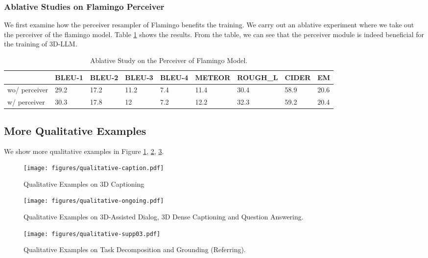 \subsubsection{Ablative Studies on Flamingo Perceiver}
We first examine how the perceiver resampler of Flamingo benefits the training. We carry out an ablative experiment where we take out the perceiver of the flamingo model. Table \ref{tab:perceiver} shows the results. From the table, we can see that the perceiver module is indeed beneficial for the training 
of 3D-LLM.
\begin{table}[!ht]
    \centering
       \small
    \begin{tabular}{l|llllllll}
    \hline
        ~ & BLEU-1 & BLEU-2 & BLEU-3 & BLEU-4 & METEOR & ROUGH\_L & CIDER & EM \\ \hline
        wo/ perceiver & 29.2 & 17.2 & 11.2 & 7.4 & 11.4 & 30.4 & 58.9 & 20.6 \\ \hline
         w/ perceiver & 30.3 & 17.8 & 12 & 7.2 & 12.2 & 32.3 & 59.2 & 20.4 \\ \hline
    \end{tabular}
    \caption{Ablative Study on the Perceiver of Flamingo Model.}
    \label{tab:perceiver}
\end{table}







\subsection{More Qualitative Examples}
We show more qualitative examples in Figure \ref{fig:caption}, \ref{fig:qualitative2}, \ref{fig:qualitative3}.

\begin{figure}[htbp]
    \centering
    \texttt{[image: figures/qualitative-caption.pdf]}
    \caption{Qualitative Examples on 3D Captioning}
    \label{fig:caption}
\end{figure}

\begin{figure}[htbp]
    \centering
    \texttt{[image: figures/qualitative-ongoing.pdf]}
    \caption{Qualitative Examples on 3D-Assisted Dialog, 3D Dense Captioning and Question Answering. }
    \label{fig:qualitative2}
\end{figure}

\begin{figure}[htbp]
    \centering
    \texttt{[image: figures/qualitative-supp03.pdf]}
    \caption{Qualitative Examples on Task Decomposition and Grounding (Referring). }
    \label{fig:qualitative3}
\end{figure}
